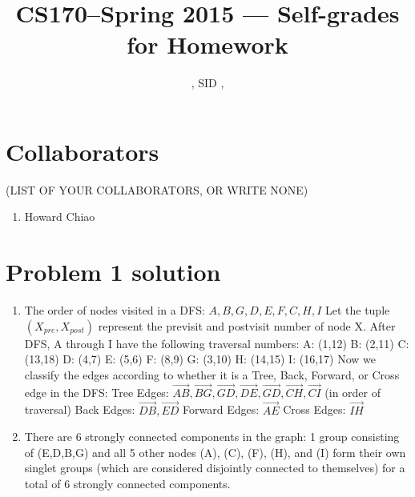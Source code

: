\documentclass[11pt]{article}
\title{CS170--Spring 2015 --- Self-grades for Homework \Homework}
\author{\Name, SID \SID, \texttt{\Login}}
\date{}
\newenvironment{qparts}{\begin{enumerate}[{(}a{)}]}{\end{enumerate}}
\begin{document}
\maketitle

\section*{Collaborators} 
(LIST OF YOUR COLLABORATORS, OR WRITE NONE)

\begin{enumerate}
\item Howard Chiao
\end{enumerate}

\newpage
\section*{Problem 1 solution}
\begin{qparts}                                               
          
\item The order of nodes visited in a DFS: $A, B, G, D, E, F, C, H, I$\newline
Let the tuple $(X_{pre}, X_{post})$ represent the previsit and postvisit number of node X. After DFS, A through I have the following traversal numbers:\newline
A: (1,12)\newline
B: (2,11)\newline
C: (13,18)\newline
D: (4,7)\newline
E: (5,6)\newline
F: (8,9)\newline
G: (3,10)\newline
H: (14,15)\newline
I: (16,17)\newline
Now we classify the edges according to whether it is a Tree, Back, Forward, or Cross edge in the DFS:\newline
Tree Edges: $\vec{AB}, \vec{BG}, \vec{GD}, 
\vec{DE}, \vec{GD}, \vec{CH}, \vec{CI}$ (in order of traversal)\newline
Back Edges: $\vec{DB}, \vec{ED}$\newline
Forward Edges: $\vec{AE}$\newline
Cross Edges: $\vec{IH}$\newline
\item There are 6 strongly connected components in the graph:
1 group consisting of (E,D,B,G) and all 5 other nodes (A), (C), (F), (H), and (I) form their own singlet groups (which are considered disjointly connected to themselves) for a total of 6 strongly connected components. 
\end{qparts}
\end{document}
